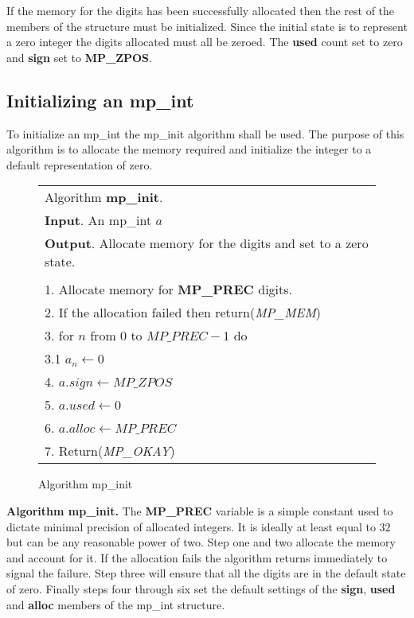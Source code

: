 \documentclass[b5paper]{book}
\begin{document}
If the memory for the digits has been successfully allocated then the rest of the members of the structure must
be initialized.  Since the initial state is to represent a zero integer the digits allocated must all be zeroed.  The
\textbf{used} count set to zero and \textbf{sign} set to \textbf{MP\_ZPOS}.

\subsection{Initializing an mp\_int}
To initialize an mp\_int the mp\_init algorithm shall be used.  The purpose of this algorithm is to allocate 
the memory required and initialize the integer to a default representation of zero.

\begin{figure}[here]
\begin{center}
\begin{tabular}{l}
\hline Algorithm \textbf{mp\_init}. \\
\textbf{Input}.   An mp\_int $a$ \\
\textbf{Output}.  Allocate memory for the digits and set to a zero state. \\
\hline \\
1.  Allocate memory for \textbf{MP\_PREC} digits. \\
2.  If the allocation failed then return(\textit{MP\_MEM}) \\
3.  for $n$ from $0$ to $MP\_PREC - 1$ do  \\
\hspace{3mm}3.1  $a_n \leftarrow 0$\\
4.  $a.sign \leftarrow MP\_ZPOS$\\
5.  $a.used \leftarrow 0$\\
6.  $a.alloc \leftarrow MP\_PREC$\\
7.  Return(\textit{MP\_OKAY})\\
\hline
\end{tabular}
\end{center}
\caption{Algorithm mp\_init}
\end{figure}

\textbf{Algorithm mp\_init.}
The \textbf{MP\_PREC} variable is a simple constant used to dictate minimal precision of allocated integers.  It is ideally at least equal to $32$ but 
can be any reasonable power of two.  Step one and two allocate the memory and account for it.  If the allocation fails the algorithm returns
immediately to signal the failure.  Step three will ensure that all the digits are in the default state of zero.  Finally steps 
four through six set the default settings of the \textbf{sign}, \textbf{used} and \textbf{alloc} members of the mp\_int structure.
\end{document}
